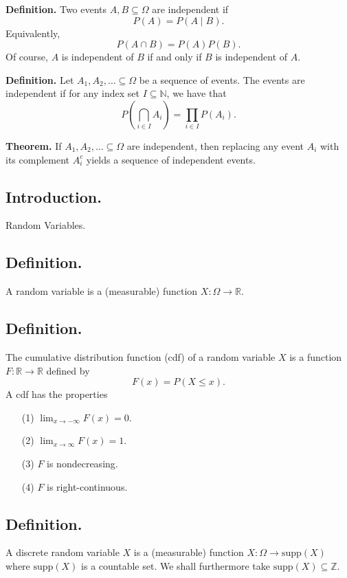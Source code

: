 \documentclass[titlepage]{article}
\begin{document}
\textbf{Definition.} Two events $A, B \subseteq \Omega$ are independent if 
$$P(A) = P(A \mid B).$$
Equivalently, 
$$P(A \cap B) = P(A)P(B).$$ Of course, $A$ is independent of $B$ if and only if $B$ is independent of $A$.

\textbf{Definition.} Let $A_{1}, A_{2}, \ldots \subseteq \Omega$ be a sequence of events. The events are independent if for any index set $I \subseteq \mathbb{N}$, we have that
$$P\left(\bigcap_{i \in I}A_{i}\right) = \prod_{i \in I}P(A_{i}).$$

\textbf{Theorem.} If $A_{1}, A_{2}, \ldots \subseteq \Omega$ are independent, then replacing any event $A_{i}$ with its complement $A_{i}^{c}$ yields a sequence of independent events.

\newpage {}

\subsection{Introduction.} Random Variables.

\subsection{Definition.} A random variable is a (measurable) function $X: \Omega \to \mathbb{R}$.

\subsection{Definition.} The cumulative distribution function (cdf) of a random variable $X$ is a function $F: \mathbb{R} \to \mathbb{R}$ defined by
$$F(x) = P(X \leq x).$$
A cdf has the properties 
\begin{enumerate}
\item[(1)] $\lim_{x \to -\infty}F(x) = 0$.
\item[(2)] $\lim_{x \to \infty}F(x) = 1$.
\item[(3)] $F$ is nondecreasing.
\item[(4)] $F$ is right-continuous.
\end{enumerate}

\subsection{Definition.} A discrete random variable $X$ is a (measurable) function $X: \Omega \to \text{supp}(X)$ where $\text{supp}(X)$ is a countable set. We shall furthermore take $\text{supp}(X) \subseteq \mathbb{Z}$.
\end{document}

